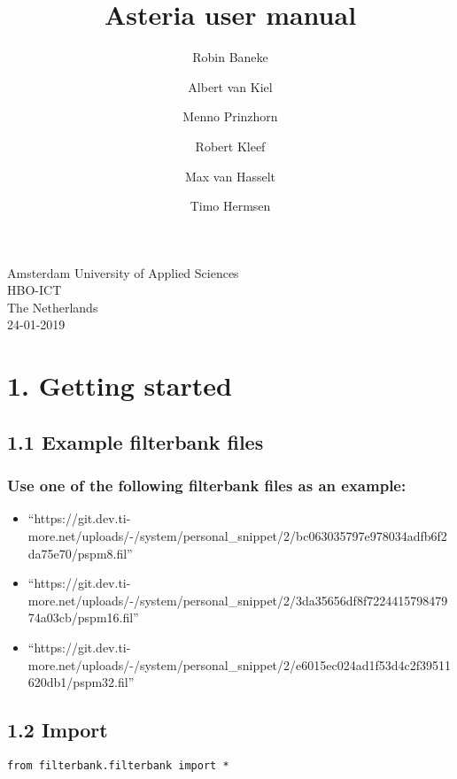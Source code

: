 \documentclass[]{article}
\title{Asteria user manual}
\author{Robin Baneke \and Albert van Kiel \and Menno Prinzhorn \and Robert Kleef \and Max van Hasselt \and Timo Hermsen}
\date{}
\providecommand{\tightlist}{%
  \setlength{\itemsep}{0pt}\setlength{\parskip}{0pt}}
\begin{document}
	\begin{titlepage}
	
	\maketitle
	
	\vspace{0.8cm}
	\begin{center}
		Amsterdam University of Applied Sciences\\
		HBO-ICT\\
		The Netherlands\\
		24-01-2019
	\end{center}
\end{titlepage}

\section{1. Getting started}\label{getting-started}

\subsection{1.1 Example filterbank
files}\label{example-filterbank-files}

\subsubsection{Use one of the following filterbank files as an
example:}\label{use-one-of-the-following-filterbank-files-as-an-example}

\begin{itemize}
\tightlist
\item
  ``https://git.dev.ti-more.net/uploads/-/system/personal\_snippet/2/bc063035797e978034adfb6f2da75e70/pspm8.fil''
\item
  ``https://git.dev.ti-more.net/uploads/-/system/personal\_snippet/2/3da35656df8f722441579847974a03cb/pspm16.fil''
\item
  ``https://git.dev.ti-more.net/uploads/-/system/personal\_snippet/2/e6015ec024ad1f53d4c2f39511620db1/pspm32.fil''
\end{itemize}

\subsection{1.2 Import}\label{import}

\begin{verbatim}
from filterbank.filterbank import *
\end{verbatim}
\end{document}
